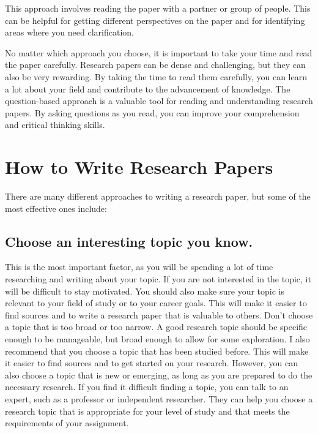 \documentclass[
  b5paper]{book}
\begin{document}
This approach involves reading the paper with a partner or group of people. This can be helpful for getting different perspectives on the paper and for identifying areas where you need clarification.

No matter which approach you choose, it is important to take your time and read the paper carefully. Research papers can be dense and challenging, but they can also be very rewarding. By taking the time to read them carefully, you can learn a lot about your field and contribute to the advancement of knowledge. The question-based approach is a valuable tool for reading and understanding research papers. By asking questions as you read, you can improve your comprehension and critical thinking skills.

\hypertarget{write}{%
\section{How to Write Research Papers}\label{write}}

There are many different approaches to writing a research paper, but some of the most effective ones include:

\hypertarget{choose-an-interesting-topic-you-know.}{%
\subsection*{Choose an interesting topic you know.}\label{choose-an-interesting-topic-you-know.}}

This is the most important factor, as you will be spending a lot of time researching and writing about your topic. If you are not interested in the topic, it will be difficult to stay motivated. You should also make sure your topic is relevant to your field of study or to your career goals. This will make it easier to find sources and to write a research paper that is valuable to others. Don't choose a topic that is too broad or too narrow. A good research topic should be specific enough to be manageable, but broad enough to allow for some exploration. I also recommend that you choose a topic that has been studied before. This will make it easier to find sources and to get started on your research. However, you can also choose a topic that is new or emerging, as long as you are prepared to do the necessary research. If you find it difficult finding a topic, you can talk to an expert, such as a professor or independent researcher. They can help you choose a research topic that is appropriate for your level of study and that meets the requirements of your assignment.
\end{document}

